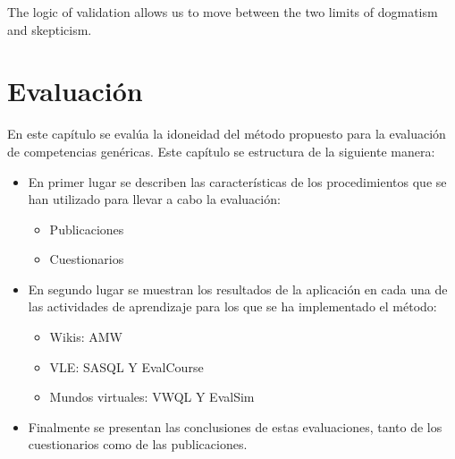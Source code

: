 

\begin{savequote}[50mm]
The logic of validation allows us to move between the two limits of dogmatism and skepticism. 
\end{savequote}


\chapter{Evaluación}
\label{cha:Validation of the methodology}

\ifpdf
    \graphicspath{{5_experiments_and_results/figures/PNG/}{5_experiments_and_results/figures/PDF/}{5_experiments_and_results/figures/}}
\else
    \graphicspath{{5_experiments_and_results/figures/EPS/}{5_experiments_and_results/figures/}}
\fi



En este capítulo se evalúa la idoneidad del método propuesto para la evaluación de competencias genéricas. Este capítulo se estructura de la siguiente manera:

\begin{itemize}
	\item En primer lugar se describen las características de los procedimientos que se han utilizado para llevar a cabo la evaluación:
		\begin{itemize}
			\item Publicaciones
			\item Cuestionarios
		\end{itemize}
	\item En segundo lugar se muestran los resultados de la aplicación en cada una de las actividades de aprendizaje para los que se ha implementado el método:
		\begin{itemize}
			\item Wikis: AMW
			\item VLE: SASQL Y EvalCourse
			\item Mundos virtuales: VWQL Y EvalSim
		\end{itemize}
	\item Finalmente se presentan las conclusiones de estas evaluaciones, tanto de los cuestionarios como de las publicaciones.
\end{itemize}

